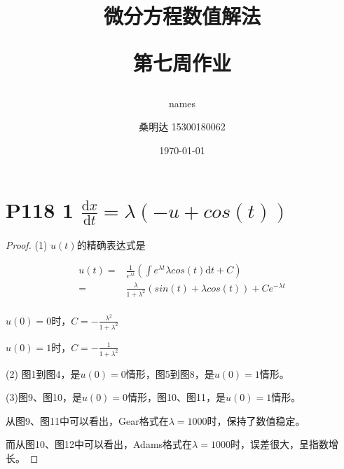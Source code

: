 \documentclass{article}%
\author{names}
\title{\heiti 微分方程数值解法\\ [2ex] \begin{large} 第七周作业 \end{large}}
\author{\kaishu 桑明达 15300180062}
\date{\today}
\begin{document}
\maketitle


\section{P118 1 $\frac{\mathrm{d}x}{\mathrm{d}t}=\lambda \left ( -u+cos\left ( t \right ) \right )$}

\begin{proof}
	
	(1) $ u \left ( t \right ) $的精确表达式是
	
\begin{align*}
	u\left ( t \right ) = & \frac{1}{e^{\lambda t}}\left ( \int e^{\lambda t}\lambda cos\left ( t \right ) \mathrm{d}t +C \right ) \\
	= & \frac{\lambda }{1+\lambda ^{2}}\left ( sin\left ( t \right ) +\lambda cos\left ( t \right ) \right )+C e^{-\lambda t} \\
\end{align*}

$u\left ( 0 \right )=0$时，$C=-\frac{\lambda ^{2}}{1+\lambda ^{2}}$

$u\left ( 0 \right )=1$时，$C=-\frac{1}{1+\lambda ^{2}}$

\par
    (2) 图1到图4，是$u\left ( 0 \right )=0$情形，图5到图8，是$u\left ( 0 \right )=1$情形。
   
\par
    (3)图9、图10，是$u\left ( 0 \right )=0$情形，图10、图11，是$u\left ( 0 \right )=1$情形。
    
    从图9、图11中可以看出，Gear格式在$\lambda =1000$时，保持了数值稳定。
    
    而从图10、图12中可以看出，Adams格式在$\lambda =1000$时，误差很大，呈指数增长。
    

\end{proof}
\end{document}
